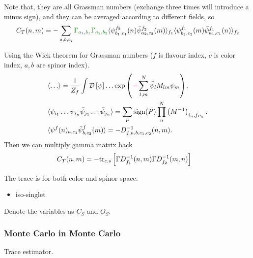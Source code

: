 Note that, they are all Grassman numbers (exchange three times will introduce a minus sign), and they can be averaged according to different fields, so
\begin{equation}
\begin{split}
&C_T(n,m)=-\sum _{{a,b,c}_i}\textcolor[rgb]{0,0.5,0}{\Gamma _{a_1,b_1}}\textcolor[rgb]{0,0.5,0}{\Gamma _{a_2,b_2}}\langle \psi ^{f_2} _{b_1,c_1} (n)\bar{\psi} ^{f_2} _{a_2,c_2}(m)\rangle _{f_1}\langle \psi ^{f_1}_{b_2,c_2}(m)\bar{\psi} ^{f_1} _{a_1,c_1} (n)\rangle _{f_2}\\
\end{split}
\end{equation}

Using the Wick theorem for Grassman numbers ($f$ is flavour index, $c$ is color index, $a,b$ are spinor index).
\begin{equation}
\begin{split}
&\langle \ldots \rangle = \frac{1}{Z_f}\int \mathcal{D}\left[\psi\right]\ldots \exp \left(\textcolor[rgb]{1,0,0}{-}\sum _{l,m}^N\bar{\psi}_lM_{lm}\psi_m\right).\\
&\langle \psi _{i_1}\ldots \psi _{i_n} \bar{\psi}_{j_1}\ldots \bar{\psi}_{j_n}\rangle = \sum _{P}{\rm sign}(P)\prod ^N_n \left(M^{-1}\right)_{i_n,j_{P_n}}.\\
&\langle \psi^f (n)_{a,c_1}\bar{\psi}^f_{b,c_2}(m)\rangle = -D_{f,a,b,c_1,c_2}^{-1}(n,m).\\
\end{split}
\end{equation}
Then we can multiply gamma matrix back
\begin{equation}
\begin{split}
&C_T(n,m)=-{\rm tr}_{c,s} \left[\Gamma D^{-1}_{f_1}(n,m)\Gamma D^{-1}_{f_2}(m,n)\right]
\end{split}
\end{equation}

The trace is for both color and spinor space.

\begin{itemize}
  \item iso-singlet
\end{itemize}

Denote the variables as $C_S$ and $O_S$.

\subsubsection{\label{MonteCarloInMonteCarlo}Monte Carlo in Monte Carlo}

Trace estimator.